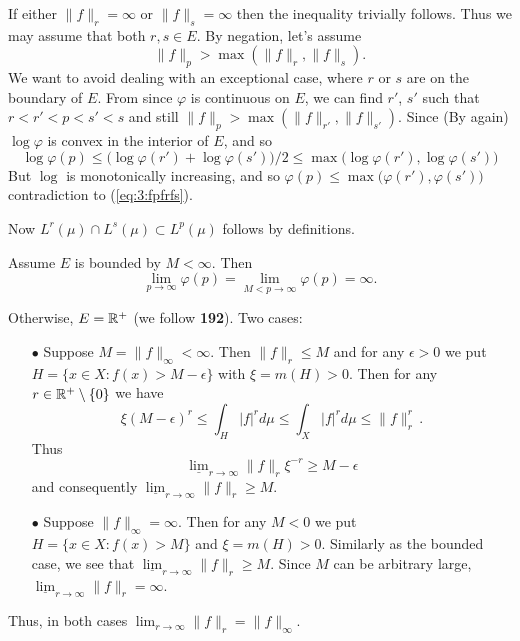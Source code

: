 \begin{enumerate}
\begin{itemize}
 If either \(\|f\|_r = \infty\) or \(\|f\|_s = \infty\)
 then the inequality trivially follows.  Thus we may assume
 that both \(r,s\in E\).
 By negation, let's assume
 \begin{equation} \label{eq:3:fpfrfs}
 \|f\|_p > \max( \|f\|_r, \|f\|_s).
 \end{equation}
 We want to avoid dealing with an exceptional case, where
 $r$ or $s$ are on the boundary of $E$.
 From  since \(\varphi\) is continuous on $E$,
 we can find \(r'\), \(s'\) such that \(r<r'<p<s'<s\)
 and still
 \(\|f\|_p > \max( \|f\|_{r'}, \|f\|_{s'})\).
 Since (By  again) \(\log\varphi\) is convex in the interior of $E$,
 and so
 \begin{equation*}
 \log\varphi(p) \leq \bigl(\log\varphi(r') + \log\varphi(s')\bigr)/2
                \leq \max(\log\varphi(r'), \log\varphi(s')\bigr)
 \end{equation*}
 But \(\log\) is monotonically increasing, and so
 \(\varphi(p) \leq \max(\varphi(r'), \varphi(s')\bigr)\)
 contradiction to (\ref{eq:3:fpfrfs}).

 Now \(L^r(\mu) \cap  L^s(\mu) \subset L^p(\mu)\) follows by definitions.

 Assume $E$ is bounded by \(M<\infty\). Then
 \begin{equation*}
 \lim_{p\to\infty}\varphi(p) =
 \lim_{M<p\to\infty}\varphi(p) = \infty.
 \end{equation*}

 Otherwise, \(E=\mathbb{R}^+\) (we follow \cite{Hardy:1952:I} \textbf{192}).
 Two cases:
 \begin{itemize}
  \item[\(\bullet\)]
   Suppose \(M = \|f\|_\infty < \infty\).
   Then \(\|f\|_r \leq M\) and for any \(\epsilon>0\)
   we put \(H=\{ x\in X: f(x)> M-\epsilon\}\) with \(\xi=m(H)>0\).
   Then for any \(r\in\mathbb{R}^+\setminus\{0\}\) we have
   \begin{equation*}
   \xi(M-\epsilon)^r \leq \int_H |f|^rd\mu
                     \leq \int_X |f|^rd\mu \leq \|f\|_r^r\,.
   \end{equation*}
   Thus %
   \begin{equation*}
   \underline{\lim}_{r\to\infty} \|f\|_r \xi^{-r} \geq M - \epsilon
   \end{equation*}
   and consequently  \(\underline{\lim}_{r\to\infty} \|f\|_r  \geq M\).

  \item[\(\bullet\)]
   Suppose \(\|f\|_\infty = \infty\). Then for any \(M<0\)
   we put \(H=\{ x\in X: f(x)> M\}\) and \(\xi = m(H) > 0\).
   Similarly as the bounded case, we see that
   \(\underline{\lim}_{r\to\infty}  \|f\|_r \geq M\).
   Since $M$ can be arbitrary large,
   \(\underline{\lim}_{r\to\infty}  \|f\|_r = \infty\).
 \end{itemize}
 Thus, in both cases \(\lim_{r\to\infty} \|f\|_r = \|f\|_\infty\).



\end{itemize}
\end{enumerate}
